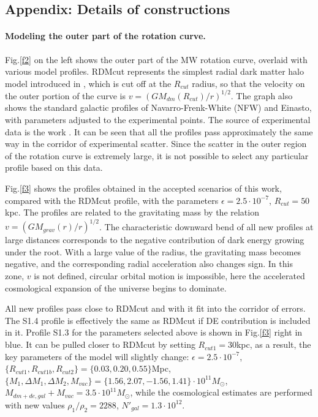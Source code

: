\documentclass{article}
\begin{document}
\subsection*{Appendix: Details of constructions}

\paragraph {Modeling the outer part of the rotation curve.} Fig.\ref {f2} on the left shows the outer part of the MW rotation curve, overlaid with various model profiles. RDMcut represents the simplest radial dark matter halo model introduced in \cite {bled2020}, which is cut off at the $ R_ {cut} $ radius, so that the velocity on the outer portion of the curve is $ v = (GM_ {dm} (R_ {cut} ) / r) ^ {1/2} $. The graph also shows the standard galactic profiles of Navarro-Frenk-White (NFW) and Einasto, with parameters adjusted to the experimental points. The source of experimental data is the work \cite {1307.8241}. It can be seen that all the profiles pass approximately the same way in the corridor of experimental scatter. Since the scatter in the outer region of the rotation curve is extremely large, it is not possible to select any particular profile based on this data.

Fig.\ref {f3} shows the profiles obtained in the accepted scenarios of this work, compared with the RDMcut profile, with the parameters $ \epsilon = 2.5 \cdot10 ^ {- 7} $, $ R_ {cut} = 50 $kpc. The profiles are related to the gravitating mass by the relation $ v = (GM_ {grav} (r) / r) ^ {1/2} $. The characteristic downward bend of all new profiles at large distances corresponds to the negative contribution of dark energy growing under the root. With a large value of the radius, the gravitating mass becomes negative, and the corresponding radial acceleration also changes sign. In this zone, $ v $ is not defined, circular orbital motion is impossible, here the accelerated cosmological expansion of the universe begins to dominate.

All new profiles pass close to RDMcut and with it fit into the corridor of errors. The S1.4 profile is effectively the same as RDMcut if DE contribution is included in it. Profile S1.3 for the parameters selected above is shown in Fig.\ref {f3} right in blue. It can be pulled closer to RDMcut by setting $ R_ {cut1} = 30 $kpc, as a result, the key parameters of the model will slightly change: $ \epsilon = 2.5 \cdot10 ^ {- 7} $, $ \{R_ {cut1}, R_ { cut1b}, R_ {cut2} \} = \{0.03,0.20,0.55 \} $Mpc, $ \{M_1, \Delta M_1, \Delta M_2, M_ {vac} \} = \{1.56, 2.07, - 1.56, 1.41 \} \cdot10 ^ {11} M_ \odot $, $ M_ {dm + de, gal} + M_ {vac} = 3.5 \cdot10 ^ {11} M_ \odot $, while the cosmological estimates are performed with new values $ \rho_1 / \rho_2 = 2288 $, $ N '_ {gal} = 1.3 \cdot10 ^ {12} $.
\end{document}

